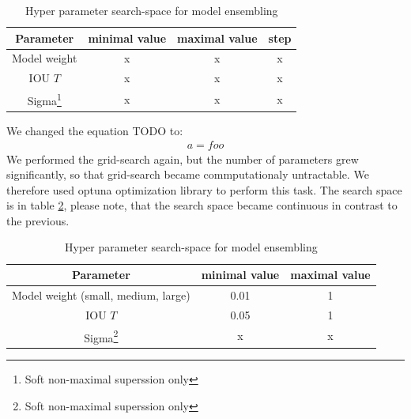 \begin{table}
    \centering
    \begin{tabular}{|c|c|c|c|}
        Parameter                                         & minimal value & maximal value & step \\ \hline
        Model weight                                      & x             & x             & x    \\ \hline
        IOU $T$                                           & x             & x             & x    \\ \hline
        Sigma\footnote{Soft non-maximal superssion only } & x             & x             & x    \\ \hline
    \end{tabular}
    \caption{Hyper parameter search-space for model ensembling}
    \label{tab:ensembling_search_space}
\end{table}

We changed the equation TODO to:
\begin{align}
    a = foo
\end{align}
We performed the grid-search again, but the number of parameters grew significantly, so that grid-search became commputationaly untractable. We therefore used optuna optimization library to perform this task. The search space is in table \ref{tab:ensembling_search_space_area}, please note, that the search space became continuous in contrast to the previous.

\begin{table}
    \centering
    \begin{tabular}{|c|c|c|}
        Parameter                                         & minimal value & maximal value \\ \hline
        Model weight (small, medium, large)               & 0.01          & 1             \\ \hline
        IOU $T$                                           & 0.05          & 1             \\ \hline
        Sigma\footnote{Soft non-maximal superssion only } & x             & x             \\ \hline
    \end{tabular}
    \caption{Hyper parameter search-space for model ensembling}
    \label{tab:ensembling_search_space_area}
\end{table}

